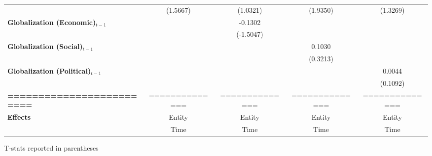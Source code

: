\begin{center}
\begin{tabular}{lcccc}
\textbf{ }                         &    (1.5667)    &     (1.0321)     &     (1.9350)     &     (1.3269)      \\
\textbf{Globalization (Economic)$_{t-1}$}             &                &     -0.1302      &                  &                   \\
\textbf{ }                         &                &    (-1.5047)     &                  &                   \\
\textbf{Globalization (Social)$_{t-1}$}             &                &                  &      0.1030      &                   \\
\textbf{ }                         &                &                  &     (0.3213)     &                   \\
\textbf{Globalization (Political)$_{t-1}$}             &                &                  &                  &      0.0044       \\
\textbf{ }                         &                &                  &                  &     (0.1092)      \\
\textbf{=========================} & ============== &  ==============  &  ==============  &  ==============   \\
\textbf{Effects}                   &     Entity     &      Entity      &      Entity      &      Entity       \\
\textbf{}                          &      Time      &       Time       &       Time       &       Time        \\
\bottomrule
\end{tabular}
\end{center}

T-stats reported in parentheses